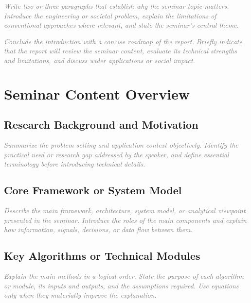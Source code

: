 \documentclass[a4paper,12pt]{article}
\newcommand{\placeholder}[1]{\textcolor{gray}{\textit{#1}}}
\begin{document}
\placeholder{Write two or three paragraphs that establish why the seminar topic matters. Introduce the engineering or societal problem, explain the limitations of conventional approaches where relevant, and state the seminar's central theme.}

\placeholder{Conclude the introduction with a concise roadmap of the report. Briefly indicate that the report will review the seminar content, evaluate its technical strengths and limitations, and discuss wider applications or social impact.}

\section{Seminar Content Overview}

\subsection{Research Background and Motivation}

\placeholder{Summarize the problem setting and application context objectively. Identify the practical need or research gap addressed by the speaker, and define essential terminology before introducing technical details.}

\subsection{Core Framework or System Model}

\placeholder{Describe the main framework, architecture, system model, or analytical viewpoint presented in the seminar. Introduce the roles of the main components and explain how information, signals, decisions, or data flow between them.}


\subsection{Key Algorithms or Technical Modules}

\placeholder{Explain the main methods in a logical order. State the purpose of each algorithm or module, its inputs and outputs, and the assumptions required. Use equations only when they materially improve the explanation.}
\end{document}
